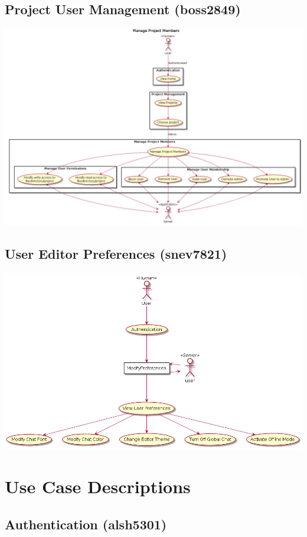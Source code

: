\documentclass[11pt]{report}
\begin{document}
\subsection{Project User Management (boss2849)} 
\includegraphics[width=\textwidth]{diagrams/boss2849}

\subsection{User Editor Preferences (snev7821)}
\includegraphics[width=\textwidth]{diagrams/snev7821}



\section{Use Case Descriptions}

\subsection{Authentication (alsh5301)}
\end{document}

